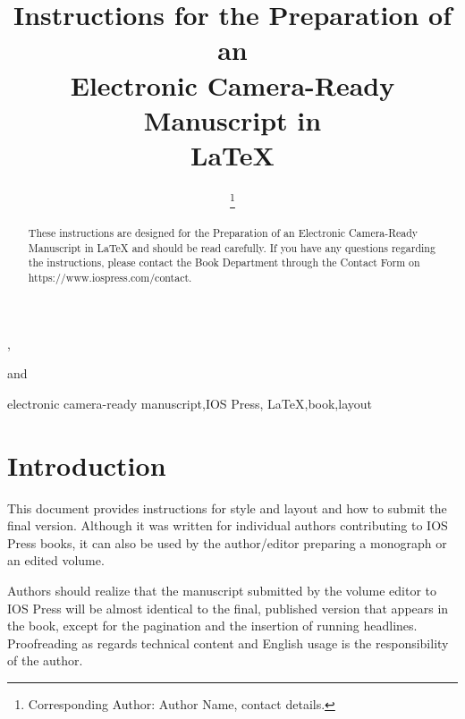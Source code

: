 \documentclass{IOS-Book-Article}
\def\hb{\hbox to 11.5 cm{}}
\begin{document}
\pagestyle{headings}
\def\thepage{}
\begin{frontmatter}              %


\title{Instructions for the Preparation of an\\
Electronic Camera-Ready Manuscript in\\ \LaTeX}

\markboth{}{April 2022\hb}

\author[A]{ %
\thanks{Corresponding Author: Author Name, contact details.}},
\author[B]{ }
and
\author[B]{ }

\address[A]{Short Affiliation of First Author}
\address[B]{Short Affiliation of Second Author and Third Author}

\begin{abstract}
These instructions are designed for the Preparation of an Electronic
Camera-Ready Manuscript in \LaTeX{} and should be read carefully. If you
have any questions regarding the instructions, please contact the Book
Department through the Contact Form on https://www.iospress.com/contact.
\end{abstract}

\begin{keyword}
electronic camera-ready manuscript\sep IOS Press\sep
\LaTeX\sep book\sep layout
\end{keyword}
\end{frontmatter}
\markboth{April 2022\hb}{April 2022\hb}

\section{Introduction}
This document provides instructions for style and layout and how to submit the final
version. Although it was written for individual authors contributing to IOS Press books,
it can also be used by the author/editor preparing a monograph or an edited volume.

Authors should realize that the manuscript submitted by the volume editor to IOS
Press will be almost identical to the final, published version that appears in the book,
except for the pagination and the insertion of running headlines. Proofreading as
regards technical content and English usage is the responsibility of the author.
\end{document}
